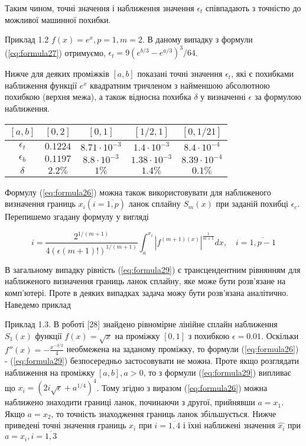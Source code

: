 \documentclass[ukrainian,14pt]{extarticle}
\begin{document}
Таким чином, точні значення і наближення значення $\epsilon_t$ співпадають з точністю до можливої машинної похибки.

\vspace{1cm}

Приклад 1.2 $f(x) = e^x, p = 1, m = 2$. В даному випадку з формули (\ref{eq:formula27}) отримуємо, $\epsilon_t = 9 (e^{b/3} - e^{a/3})^3 / 64$.

Нижче для деяких проміжків $[a, b]$ показані точні значення $\epsilon_t$, які є похибками наближення функції $e^x$ квадратним тричленом з найменшою абсолютною похибкою (верхня межа), а також відносна похибка $\delta$ у визначенні $\epsilon$ за формулою наближення.

\bgroup
\def\arraystretch{1.5}%
\begin{center}
\begin{tabular}{ c | c |
c | c | c }
 $[a, b]$ & $[0,2]$ & $[0,1]$ & $[1/2,1]$ & $[0,1/21]$ \\
 \hline
 $\epsilon_t$ & $0.1224$ & $8.71 \cdot 10^{-3}$ & $1.4 \cdot 10^{-3}$ & $8.4 \cdot 10^{-4}$ \\  
 \hline
  $\epsilon_b$ & $0.1197$ & $8.8 \cdot 10^{-3}$ & $1.38 \cdot 10^{-3}$ & $8.39 \cdot 10^{-4}$\\  
 \hline
 $\delta$ & $2.2\%$ & $1\%$ & $1.4\%$ & $0.1\%$    
\end{tabular}
\end{center}
\egroup

Формулу (\ref{eq:formula26}) можна також використовувати для наближеного визначення границь $x_i (i = \overline{1,p})$ ланок сплайну $S_m(x)$ при заданій похибці $\epsilon_c$. Перепишемо згадану формулу у вигляді

\begin{equation}\label{eq:formula29}
    i = \frac{2^{1/(m+1)}}{4(\epsilon (m+1)!)^{1/(m+1)}} \int_a^{x_i} \left| f^{(m+1) (x)} \right|^{\frac{1}{m+1}} dx, \quad i = \overline{1, p-1}
\end{equation}

В загальному випадку рівність (\ref{eq:formula29}) є трансцендентним рівнянням для наближеного визначення границь ланок сплайну, яке може бути розв'язане на комп'ютері. Проте в деяких випадках задача можу бути розв'язана аналітично. Наведемо приклад

Приклад 1.3. В роботі [28] знайдено рівномірне лінійне сплайн наближення $S_1(x)$ функції $f(x) = \sqrt{x}$ на проміжку $[0,1]$ з похибкою $\epsilon = 0.01$. Оскільки $f''(x) = -\frac{x^{-3/2}}{4}$ необмежена на заданому проміжку, то формули (\ref{eq:formula26}) - (\ref{eq:formula29}) безпосередньо застосовувати не можна. Проте якщо розглядати наближення на проміжку $[a, b], a > 0$, то з формули (\ref{eq:formula29}) випливає що $x_i = (2i \sqrt{\epsilon} + a^{1/4})^{4}$. Тому згідно з виразом (\ref{eq:formula26}) можна наближено знаходити границі ланок, починаючи з другої, прийнявши $a = x_1$. Якщо $a = x_2$, то точність знаходження границь ланок збільшується. Нижче приведені точні значення границь $x_i$ при $i = \overline{1, 4}$ і їхні наближені значення $\hat{x_i}$ при $a = x_i, i = \overline{1,3}$
\end{document}
